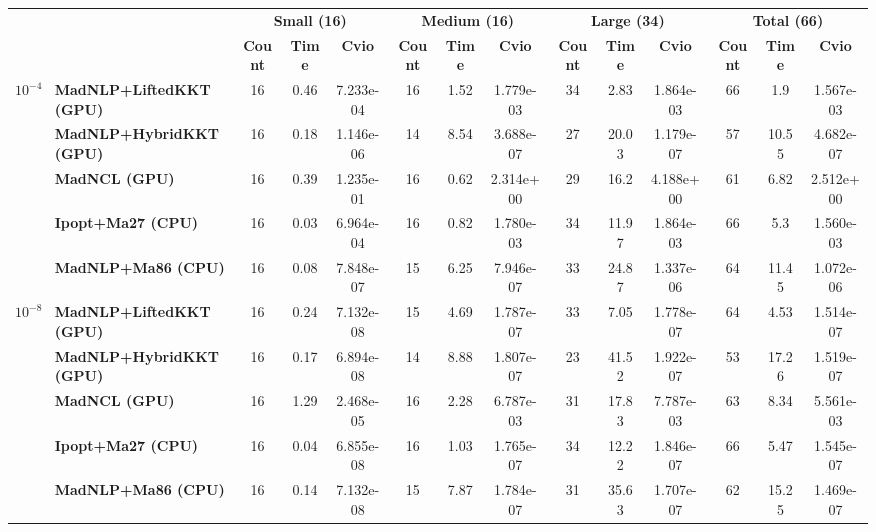 \begin{center}
\renewcommand{\arraystretch}{0.9}
\begin{tabular}{|l|l|ccc|ccc|ccc|ccc|}
\hline
 & & \multicolumn{3}{c|}{\textbf{Small (16)}} & \multicolumn{3}{c|}{\textbf{Medium (16)}} & \multicolumn{3}{c|}{\textbf{Large (34)}} & \multicolumn{3}{c|}{\textbf{Total (66)}} \\
 & & \textbf{Count} & \textbf{Time} & \textbf{Cvio} & \textbf{Count} & \textbf{Time} & \textbf{Cvio} & \textbf{Count} & \textbf{Time} & \textbf{Cvio} & \textbf{Count} & \textbf{Time} & \textbf{Cvio}\\
\hline
\multirow{5}{*}{\Large\textbf{$10^{-4}$}} & \textbf{MadNLP+LiftedKKT (GPU)} & \cellcolor{blue!15}16 & 0.46 & 7.233e-04 & \cellcolor{blue!15}16 & 1.52 & 1.779e-03 & \cellcolor{blue!15}34 & \cellcolor{blue!15}2.83 & 1.864e-03 & \cellcolor{blue!15}66 & \cellcolor{blue!15}1.9 & 1.567e-03 \\
 & \textbf{MadNLP+HybridKKT (GPU)} & \cellcolor{blue!15}16 & 0.18 & 1.146e-06 & 14 & 8.54 & \cellcolor{blue!15}3.688e-07 & 27 & 20.03 & \cellcolor{blue!15}1.179e-07 & 57 & 10.55 & \cellcolor{blue!15}4.682e-07 \\
 & \textbf{MadNCL (GPU)} & \cellcolor{blue!15}16 & 0.39 & 1.235e-01 & \cellcolor{blue!15}16 & \cellcolor{blue!15}0.62 & 2.314e+00 & 29 & 16.2 & 4.188e+00 & 61 & 6.82 & 2.512e+00 \\
 & \textbf{Ipopt+Ma27 (CPU)} & \cellcolor{blue!15}16 & \cellcolor{blue!15}0.03 & 6.964e-04 & \cellcolor{blue!15}16 & 0.82 & 1.780e-03 & \cellcolor{blue!15}34 & 11.97 & 1.864e-03 & \cellcolor{blue!15}66 & 5.3 & 1.560e-03 \\
 & \textbf{MadNLP+Ma86 (CPU)} & \cellcolor{blue!15}16 & 0.08 & \cellcolor{blue!15}7.848e-07 & 15 & 6.25 & 7.946e-07 & 33 & 24.87 & 1.337e-06 & 64 & 11.45 & 1.072e-06 \\
\hline
\multirow{5}{*}{\Large\textbf{$10^{-8}$}} & \textbf{MadNLP+LiftedKKT (GPU)} & \cellcolor{blue!15}16 & 0.24 & 7.132e-08 & 15 & 4.69 & 1.787e-07 & 33 & \cellcolor{blue!15}7.05 & 1.778e-07 & 64 & \cellcolor{blue!15}4.53 & 1.514e-07 \\
 & \textbf{MadNLP+HybridKKT (GPU)} & \cellcolor{blue!15}16 & 0.17 & 6.894e-08 & 14 & 8.88 & 1.807e-07 & 23 & 41.52 & 1.922e-07 & 53 & 17.26 & 1.519e-07 \\
 & \textbf{MadNCL (GPU)} & \cellcolor{blue!15}16 & 1.29 & 2.468e-05 & \cellcolor{blue!15}16 & 2.28 & 6.787e-03 & 31 & 17.83 & 7.787e-03 & 63 & 8.34 & 5.561e-03 \\
 & \textbf{Ipopt+Ma27 (CPU)} & \cellcolor{blue!15}16 & \cellcolor{blue!15}0.04 & \cellcolor{blue!15}6.855e-08 & \cellcolor{blue!15}16 & \cellcolor{blue!15}1.03 & \cellcolor{blue!15}1.765e-07 & \cellcolor{blue!15}34 & 12.22 & 1.846e-07 & \cellcolor{blue!15}66 & 5.47 & 1.545e-07 \\
 & \textbf{MadNLP+Ma86 (CPU)} & \cellcolor{blue!15}16 & 0.14 & 7.132e-08 & 15 & 7.87 & 1.784e-07 & 31 & 35.63 & \cellcolor{blue!15}1.707e-07 & 62 & 15.25 & \cellcolor{blue!15}1.469e-07 \\
\hline
\end{tabular}
\end{center}

